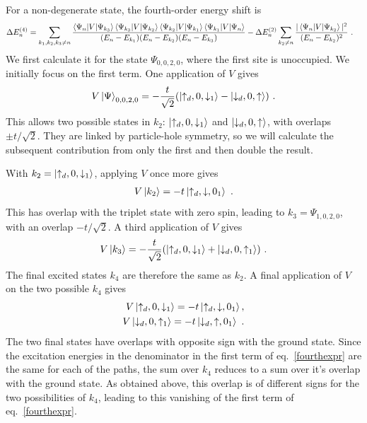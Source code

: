 For a non-degenerate state, the fourth-order energy shift is
\begin{equation}\begin{aligned}\label{fourthexpr}
\Delta E_n^{(4)}
&=
\sum_{k_1,k_2,k_3\neq n}
\frac{
\braket{\Psi_n|V|\Psi_{k_3}}
\braket{\Psi_{k_3}|V|\Psi_{k_2}}
\braket{\Psi_{k_2}|V|\Psi_{k_1}}
\braket{\Psi_{k_1}|V|\Psi_n}
}{
(E_n-E_{k_1})(E_n-E_{k_2})(E_n-E_{k_3})
}
-
\Delta E_n^{(2)}
\sum_{k_2\neq n}
\frac{
|\braket{\Psi_n|V|\Psi_{k_2}}|^2
}{
(E_n-E_{k_2})^2
}~.
\end{aligned}\end{equation}
We first calculate it for the state \(\Psi_{0,0,2,0}\), where the first site is unoccupied. We initially focus on the first term. One application of \(V\) gives
\begin{equation}\begin{aligned}
	V\ket{\Psi}_{0,0,2,0} = -\frac{t}{\sqrt 2}(\ket{\uparrow_d, 0, \downarrow_1} - \ket{\downarrow_d,0,\uparrow})~.
\end{aligned}\end{equation}
This allows two possible states in \(k_2\): \(\ket{\uparrow_d, 0, \downarrow_1}\) and \(\ket{\downarrow_d,0,\uparrow}\), with overlaps \(\pm t/\sqrt 2\). They are linked by particle-hole symmetry, so we will calculate the subsequent contribution from only the first and then double the result.

With \(k_2 = \ket{\uparrow_d, 0, \downarrow_1}\), applying \(V\) once more gives
\begin{equation}\begin{aligned}
	V\ket{k_2} = -t \ket{\uparrow_d,\downarrow,0_1}~.
\end{aligned}\end{equation}
This has overlap with the triplet state with zero spin, leading to \(k_3 = \Psi_{1,0,2,0}\), with an overlap \(-t/\sqrt 2\). A third application of \(V\) gives
\begin{equation}\begin{aligned}
	V\ket{k_3} = -\frac{t}{\sqrt 2}(\ket{\uparrow_d, 0, \downarrow_1} + \ket{\downarrow_d, 0, \uparrow_1})~.
\end{aligned}\end{equation}
The final excited states \(k_4\) are therefore the same as \(k_2\). A final application of \(V\) on the two possible \(k_4\) gives
\begin{equation}\begin{aligned}
	V\ket{\uparrow_d, 0, \downarrow_1} = -t \ket{\uparrow_d, \downarrow, 0_1},\\
	V\ket{\downarrow_d, 0, \uparrow_1} = -t \ket{\downarrow_d, \uparrow, 0_1}~.
\end{aligned}\end{equation}
The two final states have overlaps with opposite sign with the ground state. Since the excitation energies in the denominator in the first term of eq.~\ref{fourthexpr} are the same for each of the paths, the sum over \(k_4\) reduces to a sum over it's overlap with the ground state. As obtained above, this overlap is of different signs for the two possibilities of \(k_4\), leading to this vanishing of the first term of eq.~\ref{fourthexpr}.

